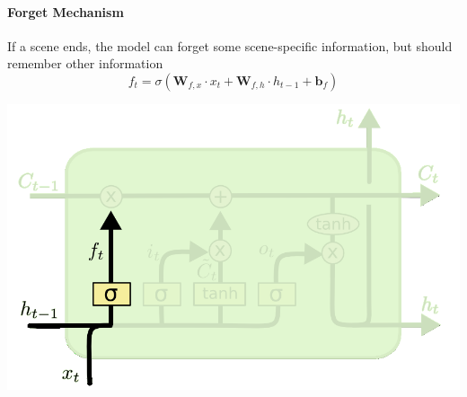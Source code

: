 \documentclass[11pt]{article}
\begin{document}
\vspace{1em}
\noindent
\begin{minipage}{0.7\linewidth}
	\paragraph{Forget Mechanism} If a scene ends, the model can forget some scene-specific information, but should remember other information
	\begin{equation*}
	f_t = \sigma(\textbf{W}_{f,x}\cdot x_t + \textbf{W}_{f,h}\cdot h_{t-1} + \textbf{b}_f)
	\end{equation*}
\end{minipage}
\qquad
\begin{minipage}{0.2\linewidth}
	\begin{center}
		\includegraphics[width=\linewidth]{img/LSTM_unit_forget_mechanism}
	\end{center}
\end{minipage}
\end{document}
